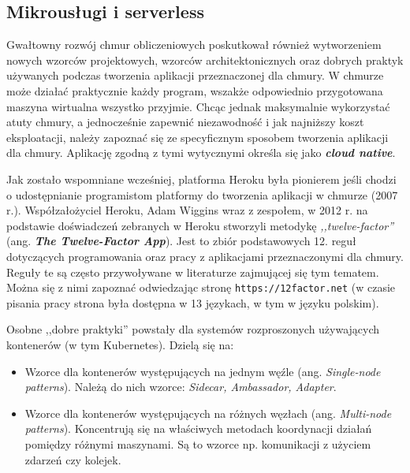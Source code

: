 \documentclass[12pt,a4paper,twoside,titlepage,openright]{book}
\begin{document}
\subsection{Mikrousługi i serverless} \label{section:mikroserwisy}

Gwałtowny rozwój chmur obliczeniowych poskutkował również wytworzeniem nowych wzorców projektowych, wzorców architektonicznych oraz dobrych praktyk używanych podczas tworzenia aplikacji przeznaczonej dla chmury. W chmurze może działać praktycznie każdy program, wszakże odpowiednio przygotowana maszyna wirtualna wszystko przyjmie. Chcąc jednak maksymalnie wykorzystać atuty chmury, a jednocześnie zapewnić niezawodność i jak najniższy koszt eksploatacji, należy zapoznać się ze specyficznym sposobem tworzenia aplikacji dla chmury. Aplikację zgodną z tymi wytycznymi określa się jako \textbf{\textit{cloud native}}.

Jak zostało wspomniane wcześniej, platforma Heroku była pionierem jeśli chodzi o udostępnianie programistom platformy do tworzenia aplikacji w chmurze (2007 r.). Współzałożyciel Heroku, Adam Wiggins wraz z zespołem, w 2012 r. na podstawie doświadczeń zebranych w Heroku stworzyli metodykę \textit{,,twelve-factor''} (ang. \textbf{\textit{The Twelve-Factor App}}). Jest to zbiór podstawowych 12. reguł dotyczących programowania oraz pracy z aplikacjami przeznaczonymi dla chmury. Reguły te są często przywoływane w literaturze zajmującej się tym tematem.\cite{cloudFoundry, microservicesPacktNetCore} Można się z nimi zapoznać odwiedzając stronę \texttt{https://12factor.net} (w czasie pisania pracy strona była dostępna w 13 językach, w tym w języku polskim).

Osobne ,,dobre praktyki'' powstały dla systemów rozproszonych używających kontenerów (w tym Kubernetes). Dzielą się na:
\begin{itemize}
\item Wzorce dla kontenerów występujących na jednym węźle (ang. \textit{Single-node patterns}). Należą do nich wzorce: \textit{Sidecar, Ambassador, Adapter}.
\item Wzorce dla kontenerów występujących na różnych węzłach (ang. \textit{Multi-node patterns}). Koncentrują się na właściwych metodach koordynacji działań pomiędzy różnymi maszynami. Są to wzorce np. komunikacji z użyciem zdarzeń czy kolejek.  \cite{kubernetesPacktMastering, distributedSystems}
\end{itemize}
\end{document}
